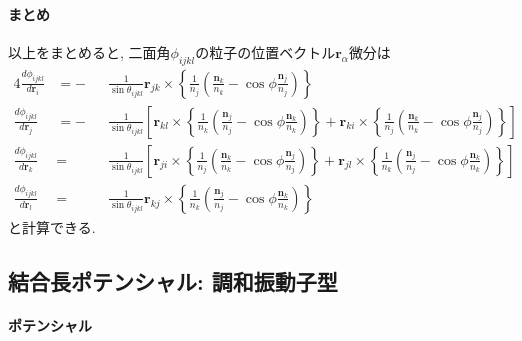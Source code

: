\paragraph{まとめ}
以上をまとめると, 二面角$\phi_{ijkl}$の粒子の位置ベクトル$\bm{r}_{\alpha}$微分は
\begin{alignat}{4}
   \frac{d \phi_{ijkl}}{d \bm{r}_{i}}
   &=
   -&&
   \frac{1}{\sin \theta_{ijkl}}
   \bm{r}_{jk} \times
   \left\{
          \frac{1}{n_{j}}
          \left(
                 \frac{\bm{n}_{k}}{n_{k}} - \cos\phi \frac{\bm{n}_{j}}{n_{j}}
          \right)
   \right\}
   \label{Eq:dphi_dri}
   \\
   \frac{d \phi_{ijkl}}{d \bm{r}_{j}}
   &=
   -&&
   \frac{1}{\sin \theta_{ijkl}}
   \left[
      \bm{r}_{kl} \times
      \left\{
             \frac{1}{n_{k}}
             \left(
                    \frac{\bm{n}_{j}}{n_{j}} - \cos\phi \frac{\bm{n}_{k}}{n_{k}}
             \right)
      \right\}
    +
      \bm{r}_{ki} \times
      \left\{
             \frac{1}{n_{j}}
             \left(
                    \frac{\bm{n}_{k}}{n_{k}} - \cos\phi \frac{\bm{n}_{j}}{n_{j}}
             \right)
      \right\}
   \right]
   \label{Eq:dphi_drj}
   \\
   \frac{d \phi_{ijkl}}{d \bm{r}_{k}}
   &=&&
   \frac{1}{\sin \theta_{ijkl}}
   \left[
      \bm{r}_{ji} \times
      \left\{
             \frac{1}{n_{j}}
             \left(
                    \frac{\bm{n}_{k}}{n_{k}} - \cos\phi \frac{\bm{n}_{j}}{n_{j}}
             \right)
      \right\}
    +
      \bm{r}_{jl} \times
      \left\{
             \frac{1}{n_{k}}
             \left(
                    \frac{\bm{n}_{j}}{n_{j}} - \cos\phi \frac{\bm{n}_{k}}{n_{k}}
             \right)
      \right\}
   \right]
   \label{Eq:dphi_drk}
   \\
   \frac{d \phi_{ijkl}}{d \bm{r}_{l}}
   &=&&
   \frac{1}{\sin \theta_{ijkl}}
   \bm{r}_{kj} \times
   \left\{
          \frac{1}{n_{k}}
          \left(
                 \frac{\bm{n}_{j}}{n_{j}} - \cos\phi \frac{\bm{n}_{k}}{n_{k}}
          \right)
   \right\}
   \label{Eq:dphi_drl}
\end{alignat}
と計算できる. 

\clearpage
\subsection{結合長ポテンシャル: 調和振動子型}
\paragraph{ポテンシャル} \

